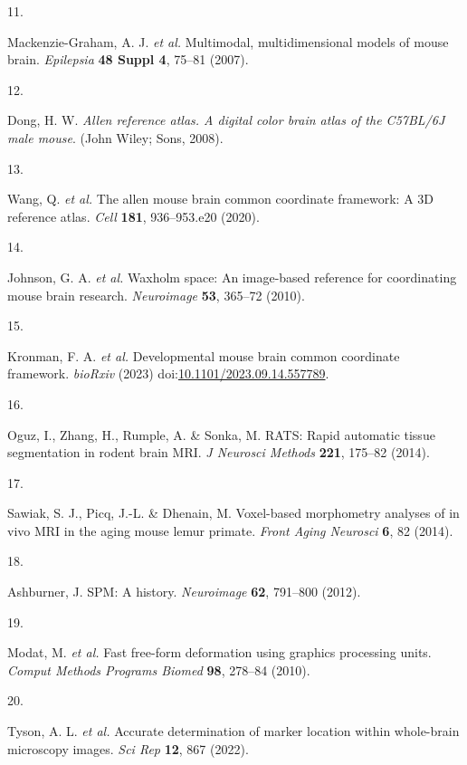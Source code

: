 \documentclass[
  12pt,
]{article}
\newlength{\cslhangindent}
\newlength{\csllabelwidth}
\newenvironment{CSLReferences}[2] %
 {%
  \setlength{\parindent}{0pt}
  \ifodd #1 \everypar{\setlength{\hangindent}{\cslhangindent}}\ignorespaces\fi
  \ifnum #2 > 0
  \setlength{\parskip}{#2\baselineskip}
  \fi
 }%
 {}
\newcommand{\CSLLeftMargin}[1]{\parbox[t]{\csllabelwidth}{#1}}
\newcommand{\CSLRightInline}[1]{\parbox[t]{\linewidth - \csllabelwidth}{#1}\break}
\begin{document}
\begin{CSLReferences}{0}{0}
\leavevmode{}%
\CSLLeftMargin{11. }
\CSLRightInline{Mackenzie-Graham, A. J. \emph{et al.} Multimodal,
multidimensional models of mouse brain. \emph{Epilepsia} \textbf{48
Suppl 4}, 75--81 (2007).}

\leavevmode{}%
\CSLLeftMargin{12. }
\CSLRightInline{Dong, H. W. \emph{Allen reference atlas. A digital color
brain atlas of the C57BL/6J male mouse}. (John Wiley; Sons, 2008).}

\leavevmode{}%
\CSLLeftMargin{13. }
\CSLRightInline{Wang, Q. \emph{et al.} The allen mouse brain common
coordinate framework: A 3D reference atlas. \emph{Cell} \textbf{181},
936--953.e20 (2020).}

\leavevmode{}%
\CSLLeftMargin{14. }
\CSLRightInline{Johnson, G. A. \emph{et al.} Waxholm space: An
image-based reference for coordinating mouse brain research.
\emph{Neuroimage} \textbf{53}, 365--72 (2010).}

\leavevmode{}%
\CSLLeftMargin{15. }
\CSLRightInline{Kronman, F. A. \emph{et al.} Developmental mouse brain
common coordinate framework. \emph{bioRxiv} (2023)
doi:\href{https://doi.org/10.1101/2023.09.14.557789}{10.1101/2023.09.14.557789}.}

\leavevmode{}%
\CSLLeftMargin{16. }
\CSLRightInline{Oguz, I., Zhang, H., Rumple, A. \& Sonka, M. RATS: Rapid
automatic tissue segmentation in rodent brain MRI. \emph{J Neurosci
Methods} \textbf{221}, 175--82 (2014).}

\leavevmode{}%
\CSLLeftMargin{17. }
\CSLRightInline{Sawiak, S. J., Picq, J.-L. \& Dhenain, M. Voxel-based
morphometry analyses of in vivo MRI in the aging mouse lemur primate.
\emph{Front Aging Neurosci} \textbf{6}, 82 (2014).}

\leavevmode{}%
\CSLLeftMargin{18. }
\CSLRightInline{Ashburner, J. {SPM}: A history. \emph{Neuroimage}
\textbf{62}, 791--800 (2012).}

\leavevmode{}%
\CSLLeftMargin{19. }
\CSLRightInline{Modat, M. \emph{et al.} Fast free-form deformation using
graphics processing units. \emph{Comput Methods Programs Biomed}
\textbf{98}, 278--84 (2010).}

\leavevmode{}%
\CSLLeftMargin{20. }
\CSLRightInline{Tyson, A. L. \emph{et al.} Accurate determination of
marker location within whole-brain microscopy images. \emph{Sci Rep}
\textbf{12}, 867 (2022).}


\end{CSLReferences}
\end{document}
